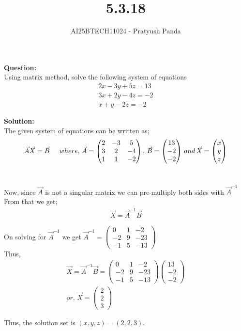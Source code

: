 \documentclass{beamer}
\title{5.3.18}
\author{AI25BTECH11024 - Pratyush Panda}
\providecommand{\brak}[1]{\ensuremath{\left(#1\right)}}
\theoremstyle{remark}
\newcommand{\myvec}[1]{\ensuremath{\begin{pmatrix}#1\end{pmatrix}}}
\numberwithin{equation}{section}
\begin{document}
\maketitle

\begin{frame}
\textbf{Question: } \\
Using matrix method, solve the following system of equations
\begin{align}
2x - 3y + 5z = 13 \\
3x + 2y - 4z = -2 \\
x + y - 2z = -2
\end{align}
\end{frame}

\begin{frame}
\textbf{Solution: } \\
The given system of equations can be written as;
\begin{align}
\Vec{A}\Vec{X}=\Vec{B} \hspace{0.5cm} where, \, \Vec{A}=\myvec{2 & -3 & 5 \\ 3 & 2 & -4 \\ 1 & 1 & -2}, \, \Vec{B}=\myvec{13 \\ -2 \\ -2} \, and \, \Vec{X}=\myvec{x \\ y \\ z}
\end{align}\

Now, since $\Vec{A}$ is not a singular matrix we can pre-multiply both sides with $\Vec{A}^{-1}$\\
From that we get;
\begin{align}
\Vec{X}=\Vec{A}^{-1}\Vec{B}
\end{align}
\end{frame}

\begin{frame}
On solving for $\Vec{A}^{-1}$ we get $\Vec{A}^{-1}=\myvec{0 & 1 & -2 \\ -2 & 9 & -23 \\ -1 & 5 & -13}$ \\

Thus,
\begin{align}
\Vec{X}=\Vec{A}^{-1}\Vec{B}=\myvec{0 & 1 & -2 \\ -2 & 9 & -23 \\ -1 & 5 & -13}\myvec{13 \\ -2 \\ -2} \\
or, \, \Vec{X}=\myvec{2 \\ 2 \\ 3}
\end{align}

Thus, the solution set is $\brak{x,y,z}=\brak{2,2,3}$.
\end{frame}
\end{document}
